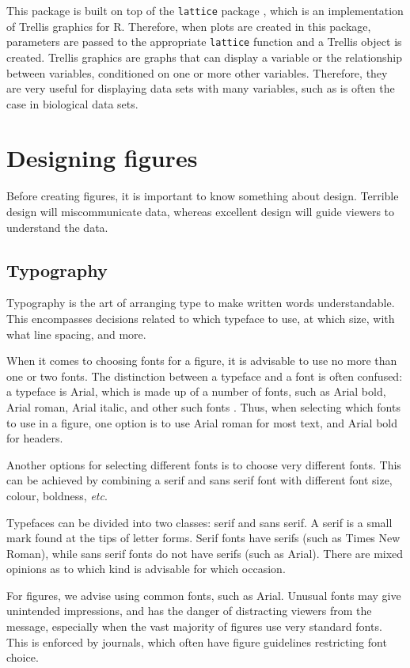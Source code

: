 \documentclass[letterpaper]{report}\usepackage[]{graphicx}\usepackage[]{color}
\begin{document}
This package is built on top of the \texttt{lattice} package \cite{lattice}, which is an implementation of Trellis graphics\cite{trellis} for R. Therefore, when plots are created in this package, parameters are passed to the appropriate \texttt{lattice} function and a Trellis object is created. Trellis graphics are graphs that can display a variable or the relationship between variables, conditioned on one or more other variables. Therefore, they are very useful for displaying data sets with many variables, such as is often the case in biological data sets.

\section{Designing figures}
Before creating figures, it is important to know something about design. Terrible design will miscommunicate data, whereas excellent design will guide viewers to understand the data\cite{tufte}. 

\subsection{Typography}
Typography is the art of arranging type to make written words understandable. This encompasses decisions related to which typeface to use, at which size, with what line spacing, and more. 

When it comes to choosing fonts for a figure, it is advisable to use no more than one or two fonts. The distinction between a typeface and a font is often confused: a typeface is Arial, which is made up of a number of fonts, such as Arial bold, Arial roman, Arial italic, and other such fonts \cite{wong-type}. Thus, when selecting which fonts to use in a figure, one option is to use Arial roman for most text, and Arial bold for headers.

Another options for selecting different fonts is to choose very different fonts. This can be achieved by combining a serif and sans serif font with different font size, colour, boldness, \emph{etc}\cite{williams}.

Typefaces can be divided into two classes: serif and \textsf{sans serif}. A serif is a small mark found at the tips of letter forms. Serif fonts have serifs (such as Times New Roman), while \textsf{sans serif} fonts do not have serifs (such as Arial). There are mixed opinions as to which kind is advisable for which occasion.

For figures, we advise using common fonts, such as Arial. Unusual fonts may give unintended impressions, and has the danger of distracting viewers from the message, especially when the vast majority of figures use very standard fonts. This is enforced by journals, which often have figure guidelines restricting font choice. 
\end{document}

